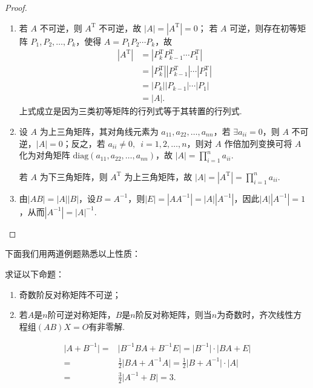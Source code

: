 \begin{proof}
\begin{enumerate}[start=2]
        \item 若 $A$ 不可逆，则 $A^\mathrm{T}$ 不可逆，故 $|A| = |A^\mathrm{T}| = 0$；
            若 $A$ 可逆，则存在初等矩阵 $P_1, P_2, \ldots, P_k$，使得 $A = P_1 P_2 \cdots P_k$，故
            \begin{align*}
                |A^\mathrm{T}| &= |P_k^\mathrm{T} P_{k-1}^\mathrm{T} \cdots P_1^\mathrm{T}| \\
                      &= |P_k^\mathrm{T}| |P_{k-1}^\mathrm{T}| \cdots |P_1^\mathrm{T}| \\
                      &= |P_k| |P_{k-1}| \cdots |P_1| \\
                      &= |A|.
            \end{align*}
            上式成立是因为三类初等矩阵的行列式等于其转置的行列式.

        \item 设 $A$ 为上三角矩阵，其对角线元素为 $a_{11}, a_{22}, \ldots, a_{nn}$，若 $\exists a_{ii} = 0$，则 $A$ 不可逆，$|A| = 0$；反之，若 $a_{ii} \neq 0, \enspace i=1,2,\ldots,n$，则对 $A$ 作倍加列变换可将 $A$ 化为对角矩阵 $\mathrm{diag}(a_{11},a_{22},\ldots,a_{nn})$，故 $|A| = \prod_{i=1}^n a_{ii}$.

            若 $A$ 为下三角矩阵，则 $A^\mathrm{T}$ 为上三角矩阵，故 $|A| = |A^\mathrm{T}| = \prod_{i=1}^n a_{ii}$.

        \item 由$|AB|=|A||B|$，设$B=A^{-1}$，则$|E|=|AA^{-1}|=|A||A^{-1}|$，因此$|A||A^{-1}|=1$，从而$|A^{-1}|=|A|^{-1}$.
    \end{enumerate}
\end{proof}

下面我们用两道例题熟悉以上性质：

\begin{example}{}{}
    求证以下命题：
    \begin{enumerate}
        \item 奇数阶反对称矩阵不可逆；

        \item 若$A$是$n$阶可逆对称矩阵，$B$是$n$阶反对称矩阵，则当$n$为奇数时，齐次线性方程组$(AB)X=O$有非零解.
    \end{enumerate}
\end{example}

\begin{solution}
    \begin{align*}
        \lvert A+B^{-1} \rvert ={} & \lvert B^{-1}BA+B^{-1}E \rvert = \lvert B^{-1} \rvert \cdot \lvert BA+E \rvert                  \\
        ={}                        & \frac{1}{2} \lvert BA+A^{-1}A \rvert = \frac{1}{2} \lvert B+A^{-1} \rvert \cdot \lvert A \rvert \\
        ={}                        & \frac{3}{2} \lvert A^{-1}+B \rvert = 3.
    \end{align*}
\end{solution}


